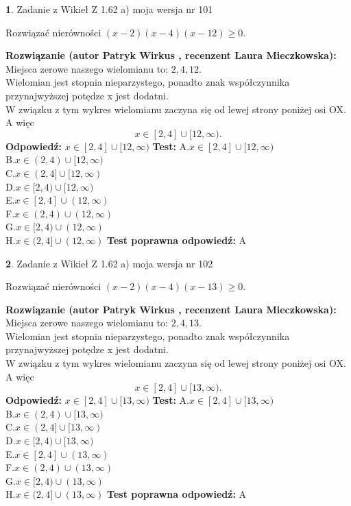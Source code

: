 \documentclass[12pt, a4paper]{article}
\theoremstyle{definition} %
\newtheorem{zad}{}
\newcommand{\zadStart}[1]{\begin{zad}#1\newline}
\newcommand{\zadStop}{\end{zad}}
\newcommand{\rozwStart}[2]{\noindent \textbf{Rozwiązanie (autor #1 , recenzent #2): }\newline}
\newcommand{\rozwStop}{\newline}
\newcommand{\odpStart}{\noindent \textbf{Odpowiedź:}\newline}
\newcommand{\odpStop}{\newline}
\newcommand{\testStart}{\noindent \textbf{Test:}\newline}
\newcommand{\testStop}{\newline}
\newcommand{\kluczStart}{\noindent \textbf{Test poprawna odpowiedź:}\newline}
\newcommand{\kluczStop}{\newline}
\begin{document}
\zadStart{Zadanie z Wikieł Z 1.62 a) moja wersja nr 101}

Rozwiązać nierówności $(x-2)(x-4)(x-12)\ge0$.
\zadStop
\rozwStart{Patryk Wirkus}{Laura Mieczkowska}
Miejsca zerowe naszego wielomianu to: $2, 4, 12$.\\
Wielomian jest stopnia nieparzystego, ponadto znak współczynnika przy\linebreak najwyższej potędze x jest dodatni.\\ W związku z tym wykres wielomianu zaczyna się od lewej strony poniżej osi OX. A więc $$x \in [2,4] \cup [12,\infty).$$
\rozwStop
\odpStart
$x \in [2,4] \cup [12,\infty)$
\odpStop
\testStart
A.$x \in [2,4] \cup [12,\infty)$\\
B.$x \in (2,4) \cup [12,\infty)$\\
C.$x \in (2,4] \cup [12,\infty)$\\
D.$x \in [2,4) \cup [12,\infty)$\\
E.$x \in [2,4] \cup (12,\infty)$\\
F.$x \in (2,4) \cup (12,\infty)$\\
G.$x \in [2,4) \cup (12,\infty)$\\
H.$x \in (2,4] \cup (12,\infty)$
\testStop
\kluczStart
A
\kluczStop



\zadStart{Zadanie z Wikieł Z 1.62 a) moja wersja nr 102}

Rozwiązać nierówności $(x-2)(x-4)(x-13)\ge0$.
\zadStop
\rozwStart{Patryk Wirkus}{Laura Mieczkowska}
Miejsca zerowe naszego wielomianu to: $2, 4, 13$.\\
Wielomian jest stopnia nieparzystego, ponadto znak współczynnika przy\linebreak najwyższej potędze x jest dodatni.\\ W związku z tym wykres wielomianu zaczyna się od lewej strony poniżej osi OX. A więc $$x \in [2,4] \cup [13,\infty).$$
\rozwStop
\odpStart
$x \in [2,4] \cup [13,\infty)$
\odpStop
\testStart
A.$x \in [2,4] \cup [13,\infty)$\\
B.$x \in (2,4) \cup [13,\infty)$\\
C.$x \in (2,4] \cup [13,\infty)$\\
D.$x \in [2,4) \cup [13,\infty)$\\
E.$x \in [2,4] \cup (13,\infty)$\\
F.$x \in (2,4) \cup (13,\infty)$\\
G.$x \in [2,4) \cup (13,\infty)$\\
H.$x \in (2,4] \cup (13,\infty)$
\testStop
\kluczStart
A
\kluczStop
\end{document}
